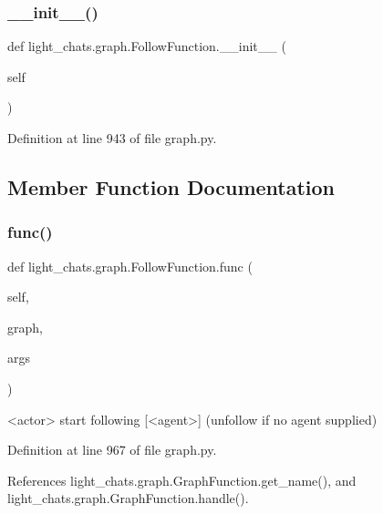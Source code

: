 \subsubsection{\texorpdfstring{\+\_\+\+\_\+init\+\_\+\+\_\+()}{\_\_init\_\_()}}
{\footnotesize\ttfamily def light\+\_\+chats.\+graph.\+Follow\+Function.\+\_\+\+\_\+init\+\_\+\+\_\+ (\begin{DoxyParamCaption}\item[{}]{self }\end{DoxyParamCaption})}



Definition at line 943 of file graph.\+py.



\subsection{Member Function Documentation}
\mbox{\label{classlight__chats_1_1graph_1_1FollowFunction_a6d1937938725b143930c10260adae130}} 
\subsubsection{\texorpdfstring{func()}{func()}}
{\footnotesize\ttfamily def light\+\_\+chats.\+graph.\+Follow\+Function.\+func (\begin{DoxyParamCaption}\item[{}]{self,  }\item[{}]{graph,  }\item[{}]{args }\end{DoxyParamCaption})}

\begin{DoxyVerb}<actor> start following [<agent>] (unfollow if no agent supplied)\end{DoxyVerb}
 

Definition at line 967 of file graph.\+py.



References light\+\_\+chats.\+graph.\+Graph\+Function.\+get\+\_\+name(), and light\+\_\+chats.\+graph.\+Graph\+Function.\+handle().

